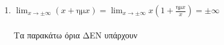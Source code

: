 \documentclass[twoside,nofonts,ektypwsh,math,spyros]{frontisthrio}
\begin{document}
\begin{enumerate}[label=\bf\arabic*.]
\begin{enumerate}[itemsep=0mm,label=\alph*.]
\item $ \displaystyle{\lim_{x\rightarrow\pm\infty}(x+\textrm{ημ}x)}= \displaystyle{\lim_{x\rightarrow\pm\infty}x\left( 1+\frac{\textrm{ημ}x}{x}\right) }=\pm\infty $\\\\
Τα παρακάτω όρια ΔΕΝ υπάρχουν
\end{enumerate}
\end{enumerate}
\end{document}
